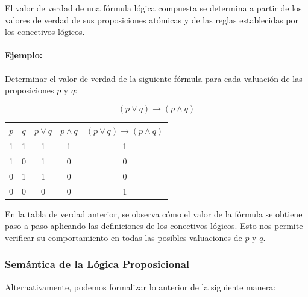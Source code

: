 El valor de verdad de una fórmula lógica compuesta se determina a partir de los valores de verdad de sus proposiciones atómicas y de las reglas establecidas por los conectivos lógicos.  

\bigskip

\paragraph{Ejemplo:} Determinar el valor de verdad de la siguiente fórmula para cada valuación de las proposiciones \( p \) y \( q \):  

\[
(p \lor q) \rightarrow (p \land q)
\]

\bigskip

\begin{center}
    \begin{tabular}{|c|c||c|c|c|}
        \hline
        \( p \) & \( q \) & \( p \lor q \) & \( p \land q \) & \( (p \lor q) \rightarrow (p \land q) \) \\
        \hline
        1 & 1 & 1 & 1 & 1 \\
        1 & 0 & 1 & 0 & 0 \\
        0 & 1 & 1 & 0 & 0 \\
        0 & 0 & 0 & 0 & 1 \\
        \hline
    \end{tabular}
\end{center}

\bigskip

En la tabla de verdad anterior, se observa cómo el valor de la fórmula se obtiene paso a paso aplicando las definiciones de los conectivos lógicos. Esto nos permite verificar su comportamiento en todas las posibles valuaciones de \( p \) y \( q \).


\subsubsection{Semántica de la Lógica Proposicional}

Alternativamente, podemos formalizar lo anterior de la siguiente manera:

